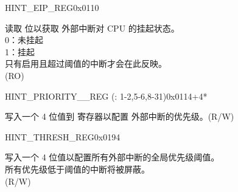 \begin{register}{H}{INT\_EIP\_REG}{0x0110}\label{regdesc:INTEIPREG}
%
%
%
%
%
%
\regnewline%
\begin{regdesc}
\begin{reglist}
\item [INT\_EIP\lbrack\regindex{n}\rbrack] 读取  位以获取  外部中断对 CPU 的挂起状态。\\
0：未挂起\\
1：挂起\\
只有启用且超过阈值的中断才会在此反映。\\
(RO)
\end{reglist}
\end{regdesc}
\end{register}

\begin{register}{H}{INT\_PRIORITY\_\_REG (: 1-2,5-6,8-31)}{0x0114+4*}\label{regdesc:INTPRIORITYREG}
%
%
\regnewline%
\begin{regdesc}
\begin{reglist}
\label{fielddesc:INTPRIORITY}\item [INT\_PRIORITY\_\regindex{n}] 写入一个 4 位值到  寄存器以配置  外部中断的优先级。(R/W)
\end{reglist}
\end{regdesc}
\end{register}

\begin{register}{H}{INT\_THRESH\_REG}{0x0194}\label{regdesc:INTTHRESHREG}
%
%
\regnewline%
\begin{regdesc}
\begin{reglist}
\label{fielddesc:INTTHRESH}\item [INT\_THRESH] 写入一个 4 位值以配置所有外部中断的全局优先级阈值。\\
所有优先级低于阈值的中断将被屏蔽。 \\
(R/W)
\end{reglist}
\end{regdesc}
\end{register}
